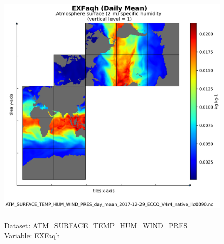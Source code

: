 \begin{figure}[H]
\centering
\includegraphics[scale=0.5]{../images/plots/native_plots/Atmosphere_Surface_Temperature_Humidity_Wind_and_Pressure/EXFaqh.png}
\caption{\\Dataset: ATM\_SURFACE\_TEMP\_HUM\_WIND\_PRES\\Variable: EXFaqh}
\label{tab:table-ATM_SURFACE_TEMP_HUM_WIND_PRES_EXFaqh-Plot}
\end{figure}
\pagebreak
